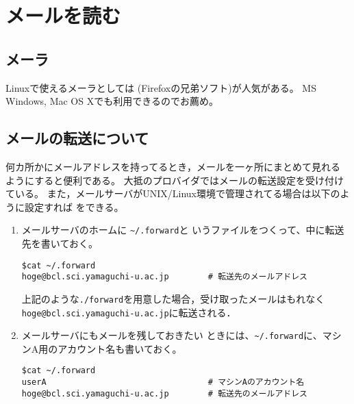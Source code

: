 \documentclass{jreport}
\begin{document}


\chapter{メールを読む}
\section{メーラ}
Linuxで使えるメーラとしては
(Firefoxの兄弟ソフト)が人気がある。
MS Windows, Mac OS Xでも利用できるのでお薦め。

\section{メールの転送について\label{sec:forward}}

何カ所かにメールアドレスを持ってるとき，メールを一ヶ所にまとめて見れる
ようにすると便利である。
大抵のプロバイダではメールの転送設定を受け付けている。
また，メールサーバがUNIX/Linux環境で管理されてる場合は以下のように設定すれば
をできる。
\begin{enumerate}
\item メールサーバのホームに \verb|~/.forward|と
  いうファイルをつくって、中に転送先を書いておく。
\begin{verbatim}
$cat ~/.forward
hoge@bcl.sci.yamaguchi-u.ac.jp        # 転送先のメールアドレス
\end{verbatim}
上記のような\verb|./forward|を用意した場合，受け取ったメールはもれなく
\verb|hoge@bcl.sci.yamaguchi-u.ac.jp|に転送される．
\item メールサーバにもメールを残しておきたい
  ときには、\verb|~/.forward|に、マシンA用のアカウント名も書いておく。
\begin{verbatim}
$cat ~/.forward
userA                                 # マシンAのアカウント名
hoge@bcl.sci.yamaguchi-u.ac.jp        # 転送先のメールアドレス
\end{verbatim}

\end{enumerate}
\end{document}
